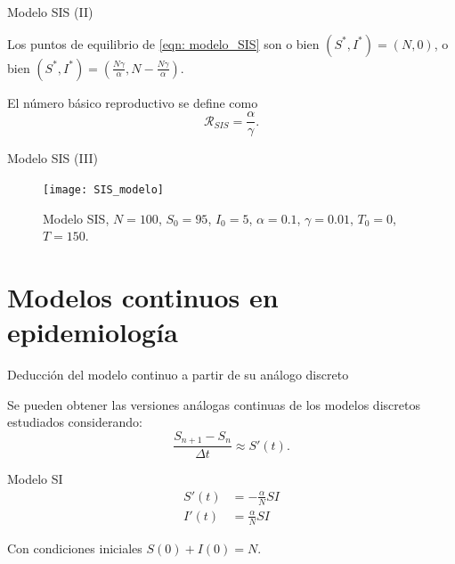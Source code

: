 \begin{frame}{Modelo SIS (II)}

    \begin{lema}
        Los puntos de equilibrio de \eqref{eqn: modelo_SIS} son o bien $(S^*,I^*)=(N,0)$, o bien $(S^*,I^*)=(\frac{N\gamma}{\alpha}, N-\frac{N\gamma}{\alpha})$.
    \end{lema}

    \pause

    \begin{definicion}
        El número básico reproductivo se define como 
        $$\mathcal{R}_{SIS}=\frac{\alpha}{\gamma}.$$
    \end{definicion}
\end{frame}


\begin{frame}{Modelo SIS (III)}


    \begin{figure}
        \begin{center}
        \caption{Modelo SIS, $N=100$, $S_0=95$, $I_0 = 5$, $\alpha = 0.1$, $\gamma=0.01$, $T_0 = 0$, $T = 150$.}
        \texttt{[image: SIS\_modelo]}
        \end{center}
    \end{figure}

\end{frame}




\section{Modelos continuos en epidemiología}


\begin{frame}{Deducción del modelo continuo a partir de su análogo discreto}

    Se pueden obtener las versiones análogas continuas de los modelos discretos estudiados considerando:    
    $$\frac{S_{n+1} - S_n}{\Delta t} \approx S'(t).$$
    
    \pause
    \begin{block}{Modelo SI}
        \begin{equation}
            \label{eqn:SI_continuo}
            \begin{aligned}
            S'(t) & = -\frac{\alpha}{N}SI \\
            I'(t) & = \frac{\alpha}{N}SI
            \end{aligned}
        \end{equation}
            
        Con condiciones iniciales $S(0)+I(0)=N$.
    \end{block}
\end{frame}


